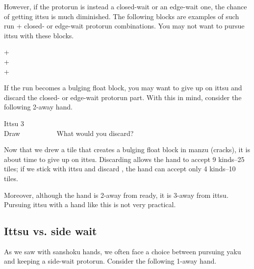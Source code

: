 \bigskip
However, if the protorun is instead a closed-wait or an edge-wait one, the chance of getting {\jap ittsu} is much diminished. The following blocks are examples of such run + closed- or edge-wait protorun combinations. You may not want to pursue {\jap ittsu} with these blocks. 


\bigskip
{\begin{center}
{\Huge {}+}  \\ [\sep]
{\Huge {}+} \\ [\sep]
{\Huge {}+} 
\end{center}}

\bigskip
If the run becomes a bulging float block, you may want to give up on {\jap ittsu} and discard the closed- or edge-wait protorun part. With this in mind, consider the following 2-away hand.

\bigskip
\begin{itembox}[r]{{\jap Ittsu} 3}
\bp
{}\bai\bai~\\
\hfill\footnotesize{Draw~~~~~~~~~~}
\ep
\vspace{-17pt}What would you discard? \vspace{-5pt}
\end{itembox}

\bigskip
Now that we drew a tile that creates a bulging float block in {\jap manzu} (cracks), it is about time to give up on {\jap ittsu}. Discarding {\LARGE{}} allows the hand to accept 9 kinds--25 tiles; if we stick with {\jap ittsu} and discard {\LARGE{}}, the hand can accept only 4 kinds--10 tiles. 

\bigskip
Moreover, although the hand is 2-away from ready, it is 3-away from {\jap ittsu}. Pursuing {\jap ittsu} with a hand like this is not very practical.

\bigskip
\subsection{{\jap Ittsu} vs. side wait}
As we saw with {\jap sanshoku} hands, we often face a choice between pursuing {\jap yaku} and keeping a side-wait protorun. Consider the following 1-away hand. 

